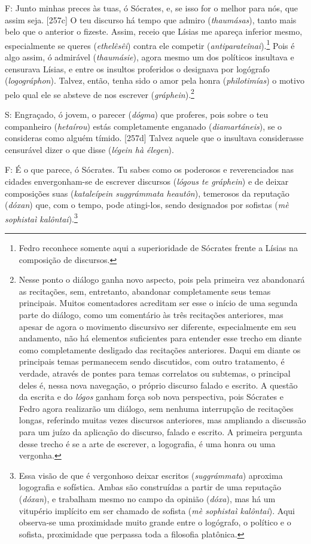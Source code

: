 F: Junto minhas preces às tuas, ó Sócrates, e, se isso for o melhor para
nós, que assim seja. {[}257c{]} O teu discurso há tempo que admiro
(\emph{thaumásas}), tanto mais belo que o anterior o fizeste. Assim,
receio que Lísias me apareça inferior mesmo, especialmente se queres
(\emph{ethelêsêi}) contra ele competir
(\emph{antiparateînai}).\footnote{Fedro reconhece somente aqui a
  superioridade de Sócrates frente a Lísias na composição de discursos.}
Pois é algo assim, ó admirável (\emph{thaumásie}), agora mesmo um dos
políticos insultava e censurava Lísias, e entre os insultos proferidos o
designava por logógrafo (\emph{logográphon}). Talvez, então, tenha sido
o amor pela honra (\emph{philotimías}) o motivo pelo qual ele se absteve
de nos escrever (\emph{gráphein}).\footnote{Nesse ponto o diálogo ganha
  novo aspecto, pois pela primeira vez abandonará as recitações, sem,
  entretanto, abandonar completamente seus temas principais. Muitos
  comentadores acreditam ser esse o início de uma segunda parte do
  diálogo, como um comentário às três recitações anteriores, mas apesar
  de agora o movimento discursivo ser diferente, especialmente em seu
  andamento, não há elementos suficientes para entender esse trecho em
  diante como completamente desligado das recitações anteriores. Daqui
  em diante os principais temas permanecem sendo discutidos, com outro
  tratamento, é verdade, através de pontes para temas correlatos ou
  subtemas, o principal deles é, nessa nova navegação, o próprio
  discurso falado e escrito. A questão da escrita e do \emph{lógos}
  ganham força sob nova perspectiva, pois Sócrates e Fedro agora
  realizarão um diálogo, sem nenhuma interrupção de recitações longas,
  referindo muitas vezes discursos anteriores, mas ampliando a discussão
  para um juízo da aplicação do discurso, falado e escrito. A primeira
  pergunta desse trecho é se a arte de escrever, a logografia, é uma
  honra ou uma vergonha.}

S: Engraçado, ó jovem, o parecer (\emph{dógma}) que proferes, pois sobre
o teu companheiro (\emph{hetaírou}) estás completamente enganado
(\emph{diamartáneis}), se o consideras como alguém tímido. {[}257d{]}
Talvez aquele que o insultava considerasse censurável dizer o que disse
(\emph{légein hà élegen}).

F: É o que parece, ó Sócrates. Tu sabes como os poderosos e
reverenciados nas cidades envergonham-se de escrever discursos
(\emph{lógous te gráphein}) e de deixar composições suas
(\emph{kataleípein suggrámmata heautôn}), temerosos da reputação
(\emph{dóxan}) que, com o tempo, pode atingi-los, sendo designados por
sofistas (\emph{mè sophistaì kalôntai}).\footnote{Essa visão de que é
  vergonhoso deixar escritos (\emph{suggrámmata}) aproxima logografia e
  sofística. Ambas são construídas a partir de uma reputação
  (\emph{dóxan}), e trabalham mesmo no campo da opinião (\emph{dóxa}),
  mas há um vitupério implícito em ser chamado de sofista (\emph{mè
  sophistaì kalôntai}). Aqui observa-se uma proximidade muito grande
  entre o logógrafo, o político e o sofista, proximidade que perpassa
  toda a filosofia platônica.}

